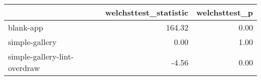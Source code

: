 \begin{tabular}{lrr}
\toprule
{} &  welchsttest\_statistic &  welchsttest\_p \\
\midrule
blank-app                    &                 164.32 &           0.00 \\
simple-gallery               &                   0.00 &           1.00 \\
simple-gallery-lint-overdraw &                  -4.56 &           0.00 \\
\bottomrule
\end{tabular}
